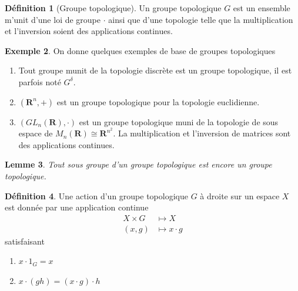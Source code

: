 \documentclass[12pt]{book}
\newtheorem{lemma}{Lemme}[section]
\theoremstyle{definition}
\newtheorem{definition}[lemma]{Définition}
\newtheorem{example}[lemma]{Exemple}
\theoremstyle{remark}
\begin{document}
	\begin{definition}[Groupe topologique]
		Un groupe topologique $G$ est un ensemble m'unit d'une loi de groupe $\cdot$ ainsi que d'une topologie telle que la multiplication et l'inversion soient des applications continues. 
	\end{definition}

	\begin{example} On donne quelques exemples de base de groupes topologiques \\
		\begin{enumerate}
			\item Tout groupe munit de la topologie discrète est un groupe topologique, il est parfois noté $G^{\delta}$.
			\item $(\mathbf{R}^n,+)$ est un groupe topologique pour la topologie euclidienne.
			\item $(GL_n(\mathbf{R}),\cdot)$ est un groupe topologique muni de la topologie de sous espace de $M_n(\mathbf{R}) \cong \mathbf{R}^{n^2}$. La multiplication et l'inversion de matrices sont des applications continues. 
		\end{enumerate}	
	\end{example}

	\begin{lemma}
		Tout sous groupe d'un groupe topologique est encore un groupe topologique.
	\end{lemma}

	\begin{definition}
		Une action d'un groupe topologique $G$ à droite sur un espace $X$ est donnée par une application continue
		\begin{align*}
			X \times G &\longmapsto X \\
			(x,g) &\longmapsto x\cdot g
		\end{align*} satisfaisant 

		\begin{enumerate}
			\item $x \cdot 1_G = x$
			\item $x \cdot (gh) = (x \cdot g)\cdot h$
		\end{enumerate}
	\end{definition}
\end{document}

